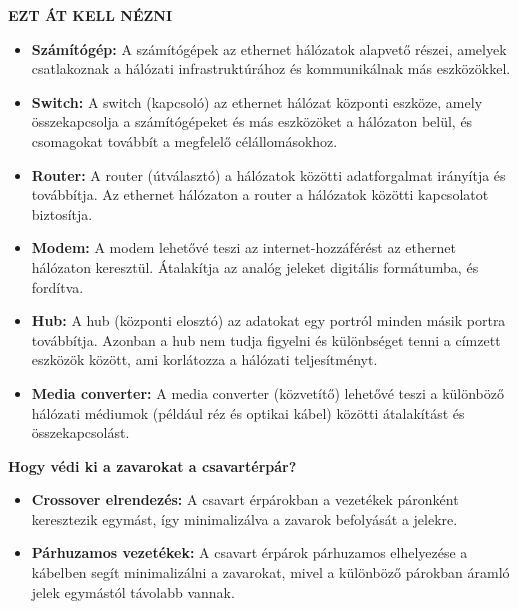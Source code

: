 \documentclass[11pt,a4paper]{article}
\begin{document}
            \begin{tcolorbox}[colback=blue!5!white,colframe=blue!50!black,title= 42. Ismertesse az ethernet hálózaton használt eszközöket!]
                                        \textbf{EZT ÁT KELL NÉZNI}   
                                        \begin{itemize}
                                            \item \textbf{Számítógép:} A számítógépek az ethernet hálózatok alapvető részei, amelyek csatlakoznak a hálózati infrastruktúrához és kommunikálnak más eszközökkel.
                                            \item \textbf{Switch:} A switch (kapcsoló) az ethernet hálózat központi eszköze, amely összekapcsolja a számítógépeket és más eszközöket a hálózaton belül, és csomagokat továbbít a megfelelő célállomásokhoz.
                                            \item \textbf{Router:} A router (útválasztó) a hálózatok közötti adatforgalmat irányítja és továbbítja. Az ethernet hálózaton a router a hálózatok közötti kapcsolatot biztosítja.
                                            \item \textbf{Modem:} A modem lehetővé teszi az internet-hozzáférést az ethernet hálózaton keresztül. Átalakítja az analóg jeleket digitális formátumba, és fordítva.
                                            \item \textbf{Hub:} A hub (központi elosztó) az adatokat egy portról minden másik portra továbbítja. Azonban a hub nem tudja figyelni és különbséget tenni a címzett eszközök között, ami korlátozza a hálózati teljesítményt.
                                            \item \textbf{Media converter:} A media converter (közvetítő) lehetővé teszi a különböző hálózati médiumok (például réz és optikai kábel) közötti átalakítást és összekapcsolást.
                                        \end{itemize}
                                        \textbf{Hogy védi ki a zavarokat a csavartérpár?}
                                        \begin{itemize}
                                            \item \textbf{Crossover elrendezés:} A csavart érpárokban a vezetékek páronként keresztezik egymást, így minimalizálva a zavarok befolyását a jelekre.
                                            \item \textbf{Párhuzamos vezetékek:} A csavart érpárok párhuzamos elhelyezése a kábelben segít minimalizálni a zavarokat, mivel a különböző párokban áramló jelek egymástól távolabb vannak.

\end{itemize}
\end{tcolorbox}
\end{document}
